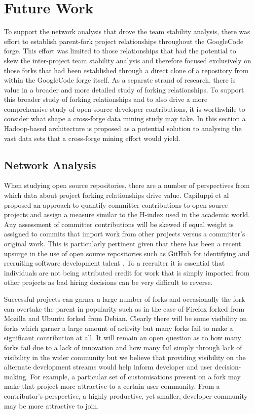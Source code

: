 \section{Future Work} %
To support the network analysis that drove the team stability analysis, there was effort to establish parent-fork project relationships throughout the GoogleCode forge. This effort was limited to those relationships that had the potential to skew the inter-project team stability analysis and therefore focused exclusively on those forks that had been established through a direct clone of a repository from within the GoogleCode forge itself. As a separate strand of research, there is value in a broader and more detailed study of forking relationships.
To support this broader study of forking relationships and to also drive a more comprehensive study of open source developer contributions, it is worthwhile to consider what shape a cross-forge data mining study may take. In this section a Hadoop-based architecture is proposed as a potential solution to analysing the vast data sets that a cross-forge mining effort would yield. 

\subsection{Network Analysis}
When studying open source repositories, there are a number of perspectives from which data about project forking relationships drive value. Capiluppi et al \citep{capiluppi2012developing} proposed  an approach to quantify committer contributions to open source projects and assign a measure similar to the H-index used in the academic world. Any assessment of committer contributions will be skewed if equal weight is assigned to commits that import work from other projects versus a committer's original work.  This is particularly pertinent given that there has been a recent upsurge in the use of open source repositories such as GitHub for identifying and recruiting software development talent \citep{ISO15504}. To a recruiter it is essential that individuals are not being attributed credit for work that is simply imported from other projects as bad hiring decisions can be very difficult to reverse.

Successful projects can garner a large number of forks and occasionally the fork can overtake the parent in popularity such as in the case of Firefox forked from Mozilla and Ubuntu forked from Debian. Clearly there will be some visibility on forks which garner a large amount of activity but many forks fail to make a significant contribution at all. It will remain an open question as to how many forks fail due to a lack of innovation and how many fail simply through lack of visibility in the wider community but we believe that providing visibility on the  alternate development streams would help inform developer and user decision-making. For example, a particular set of customisations present on a fork may make that project more attractive to a certain user community. From a contributor's perspective, a highly productive, yet smaller, developer community may be more attractive to join.

